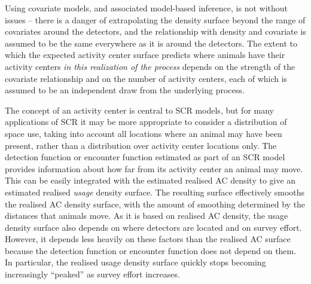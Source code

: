 \documentclass[useAMS,usenatbib,referee]{biom}
\begin{document}
Using covariate models, and associated model-based inference, is not without issues -- there is a danger of extrapolating the density surface beyond the range of covariates around the detectors, and the relationship with density and covariate is assumed to be the same everywhere as it is around the detectors. The extent to which the expected activity center surface predicts where animals have their activity centers {\it in this realization of the process} depends on the strength of the covariate relationship and on the number of activity centers, each of which is assumed to be an independent draw from the underlying process. %

The concept of an activity center is central to SCR models, but for many applications of SCR it may be more appropriate to consider a distribution of space use, taking into account all locations where an animal may have been present, rather than a distribution over activity center locations only. The detection function or encounter function estimated as part of an SCR model provides information about how far from its activity center an animal may move. This can be easily integrated with the estimated realised AC density to give an estimated realised {\it usage} density surface. The resulting surface effectively smooths the realised AC density surface, with the amount of smoothing determined by the distances that animals move. As it is based on realised AC density, the usage density surface also depends on where detectors are located and on survey effort. However, it depends less heavily on these factors than the realised AC surface because the detection function or encounter function does not depend on them. In particular, the realised usage density surface quickly stops becoming increasingly ``peaked'' as survey effort increases.
\end{document}
